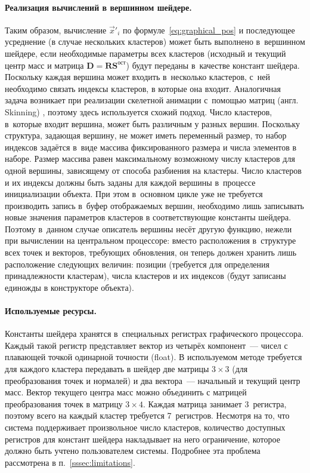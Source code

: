 \documentclass[a4paper, 14pt, titlepage]{extarticle}
\newcommand{\eng}[1]{{\English #1}}
\newcommand{\vect}[1]{\vec{#1}} %
\newcommand{\matx}[1]{\mathbf{#1}} %
\begin{document}
        \paragraph{Реализация вычислений в вершинном шейдере.}
        Таким образом, вычисление $\vect{x}'_i$ по формуле~\eqref{eq:graphical_pos} и последующее
        усреднение (в случае нес\-коль\-ких кластеров) может быть выполнено в~вершинном шейдере, если
        необходимые параметры всех кластеров (исходный и текущий центр масс и матрица $\matx D =
        \matx{R} \matx{S}^{ост}$) будут переданы в~качестве констант шейдера. Поскольку каждая
        вершина может входить в~несколько кластеров, с~ней необходимо связать индексы кластеров, в
        которые она входит. Аналогичная задача возникает при реализации скелетной анимации с~помощью
        матриц (англ. \eng{Skinning}) \cite{gpu-gems-skinning}, поэтому здесь используется схожий подход.
        Число кластеров, в~которые входит вершина, может быть различным у разных вершин. Поскольку
        структура, задающая вершину, не может иметь переменный размер, то набор индексов задаётся
        в~виде массива фиксированного размера и числа элементов в наборе. Размер массива равен
        максимальному возможному числу кластеров для одной вершины, зависящему от способа разбиения
        на кластеры. Число кластеров и их индексы должны быть заданы для каждой вершины в~процессе
        инициализации объекта. При этом в~основном цикле уже не требуется
        производить запись в~буфер отображаемых вершин, необходимо лишь записывать новые значения
        параметров кластеров в соответствующие константы шейдера. Поэтому в~данном случае описатель
        вершины несёт другую функцию, нежели при вычислении на центральном процессоре: вместо
        расположения в~структуре всех точек и векторов, требующих обновления, он теперь должен
        хранить лишь расположение следующих величин: позиции (требуется для определения
        принадлежности кластерам), числа кластеров и их индексов (будут записаны единожды в
        конструкторе объекта).

        \paragraph{Используемые ресурсы.}
        Константы шейдера хранятся в~специальных регистрах графического процессора. Каждый такой регистр
        представляет вектор из четырёх компонент~--- чисел с плавающей точкой одинарной точности
        (float). В используемом методе требуется для каждого
        кластера передавать в шейдер две матрицы $3 \times 3$ (для преобразования точек и нормалей) и два
        вектора~--- начальный и текущий центр масс. Вектор текущего центра масс можно объединить с
        матрицей преобразования точек в матрицу $3 \times 4$. Каждая матрица занимает 3~регистра,
        поэтому всего на каждый кластер требуется 7~регистров. Несмотря на то, что система
        поддерживает произвольное число кластеров, количество доступных регистров для констант
        шейдера накладывает на него ограничение, которое должно быть учтено пользователем системы.
        Подробнее эта проблема рассмотрена в п.~\ref{sssec:limitations}.
\end{document}

